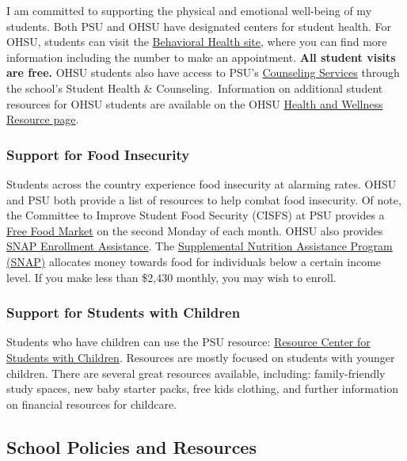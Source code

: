 \documentclass[
  letterpaper,
  DIV=11,
  numbers=noendperiod]{scrartcl}
\begin{document}
I am committed to supporting the physical and emotional well-being of my
students. Both PSU and OHSU have designated centers for student health.
For OHSU, students can visit the
\href{https://www.ohsu.edu/education/behavioral-health}{Behavioral
Health site}, where you can find more information including the number
to make an appointment. \textbf{All student visits are free.} OHSU
students also have access to PSU's
\href{https://www.pdx.edu/health-counseling/counseling}{Counseling
Services} through the school's Student Health \& Counseling.~Information
on additional student resources for OHSU students are available on the
OHSU \href{https://ohsu-psu-sph.org/health_and_wellness/}{Health and
Wellness Resource page}.~

\subsubsection{Support for Food
Insecurity}\label{support-for-food-insecurity}

Students across the country experience food insecurity at alarming
rates. OHSU and PSU both provide a list of resources to help combat food
insecurity. Of note, the Committee to Improve Student Food Security
(CISFS) at PSU provides a
\href{https://www.pdx.edu/student-access-center/free-food-market}{Free
Food Market} on the second Monday of each month. OHSU also provides
\href{https://o2.ohsu.edu/student-central/health-wellness/student-food-resources/snap.cfm}{SNAP
Enrollment Assistance}. The
\href{https://oregonhunger.org/snap-for-students/}{Supplemental
Nutrition Assistance Program (SNAP)} allocates money towards food for
individuals below a certain income level. If you make less than \$2,430
monthly, you may wish to enroll.

\subsubsection{Support for Students with
Children}\label{support-for-students-with-children}

Students who have children can use the PSU resource:
\href{https://www.pdx.edu/students-with-children/}{Resource Center for
Students with Children}. Resources are mostly focused on students with
younger children. There are several great resources available,
including: family-friendly study spaces, new baby starter packs, free
kids clothing, and further information on financial resources for
childcare.

\subsection{School Policies and
Resources}\label{school-policies-and-resources}
\end{document}
